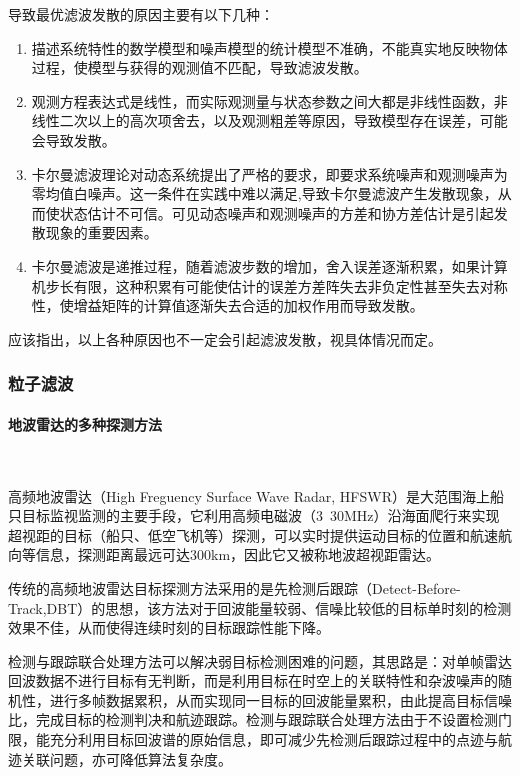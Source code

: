         导致最优滤波发散的原因主要有以下几种：
        \begin{enumerate}[(1)]
            \item 描述系统特性的数学模型和噪声模型的统计模型不准确，不能真实地反映物体过程，使模型与获得的观测值不匹配，导致滤波发散。
            \item 观测方程表达式是线性，而实际观测量与状态参数之间大都是非线性函数，非线性二次以上的高次项舍去，以及观测粗差等原因，导致模型存在误差，可能会导致发散。
            \item 卡尔曼滤波理论对动态系统提出了严格的要求，即要求系统噪声和观测噪声为零均值白噪声。这一条件在实践中难以满足,导致卡尔曼滤波产生发散现象，从而使状态估计不可信。可见动态噪声和观测噪声的方差和协方差估计是引起发散现象的重要因素。
            \item 卡尔曼滤波是递推过程，随着滤波步数的增加，舍入误差逐渐积累，如果计算机步长有限，这种积累有可能使估计的误差方差阵失去非负定性甚至失去对称性，使增益矩阵的计算值逐渐失去合适的加权作用而导致发散。
        \end{enumerate}
        
        应该指出，以上各种原因也不一定会引起滤波发散，视具体情况而定。

\subsubsection{粒子滤波}

\paragraph{地波雷达的多种探测方法}~{}

        高频地波雷达（High Freguency Surface Wave Radar, HFSWR）是大范围海上船只目标监视监测的主要手段，它利用高频电磁波（3~30MHz）沿海面爬行来实现超视距的目标（船只、低空飞机等）探测，可以实时提供运动目标的位置和航速航向等信息，探测距离最远可达300km，因此它又被称地波超视距雷达。
        
        传统的高频地波雷达目标探测方法采用的是先检测后跟踪（Detect-Before-Track,DBT）的思想，该方法对于回波能量较弱、信噪比较低的目标单时刻的检测效果不佳，从而使得连续时刻的目标跟踪性能下降。
        
        检测与跟踪联合处理方法可以解决弱目标检测困难的问题，其思路是：对单帧雷达回波数据不进行目标有无判断，而是利用目标在时空上的关联特性和杂波噪声的随机性，进行多帧数据累积，从而实现同一目标的回波能量累积，由此提高目标信噪比，完成目标的检测判决和航迹跟踪。检测与跟踪联合处理方法由于不设置检测门限，能充分利用目标回波谱的原始信息，即可减少先检测后跟踪过程中的点迹与航迹关联问题，亦可降低算法复杂度。
       
